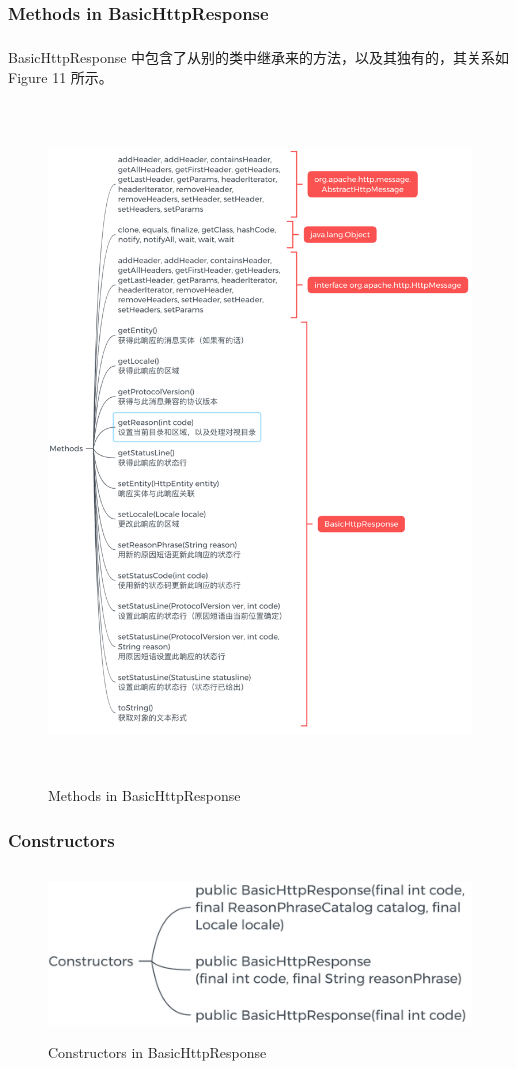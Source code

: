 \documentclass{article}
\begin{document}
	\subsubsection{Methods in BasicHttpResponse}
	\begin{CJK}{UTF8}{gbsn}
		\subparagraph{}
		BasicHttpResponse 中包含了从别的类中继承来的方法，以及其独有的，其关系如 Figure 11 所示。
	\end{CJK}{}
	\begin{figure}[H]
		\centering
		\includegraphics[height = 18cm, width = 15cm]{pics/21_BasicHttpResponse.png}	
		\caption{Methods in BasicHttpResponse}
	\end{figure}

	\subsubsection{Constructors}
	\begin{figure}[H]
		\centering
		\includegraphics[height = 4.5cm, width = 13cm]{pics/22_Response_constructors.png}	
		\caption{Constructors in BasicHttpResponse}
	\end{figure}
\end{document}
